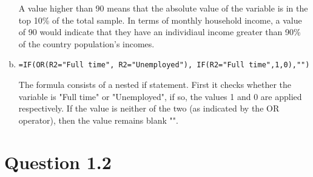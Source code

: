 \documentclass{article} \usepackage{graphicx} %
\newcommand{\formula}[1]{\small\texttt{#1}\normalsize}
\newcommand{\itemspace}{\vspace{1em}\item}
\begin{document}
\begin{enumerate}[a)]
    A value higher than 90 means that the absolute value of the variable is in
    the top 10\% of the total sample. In terms of monthly household income, a
    value of 90 would indicate that they have an individiaul income greater
    than 90\% of the country population's incomes.
    
  \itemspace 

     \par 
    
    \formula{=IF(OR(R2="Full time", R2="Unemployed"), IF(R2="Full
    time",1,0),"")} \par
    
     \par 

    The formula consists of a nested if statement. First it checks whether the
    variable is "Full time" or "Unemployed", if so, the values 1 and 0 are
    applied respectively. If the value is neither of the two (as indicated by
    the OR operator), then the value remains blank "". 
\end{enumerate}

\section{Question 1.2}
\end{document}
